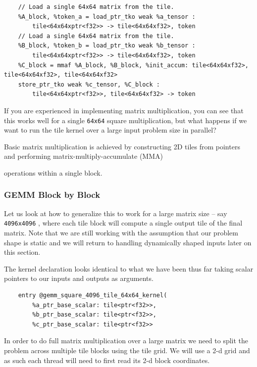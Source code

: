 \documentclass{article}
\begin{document}
\begin{lstlisting}
    // Load a single 64x64 matrix from the tile.
    %A_block, %token_a = load_ptr_tko weak %a_tensor :
        tile<64x64xptr<f32>> -> tile<64x64xf32>, token
    // Load a single 64x64 matrix from the tile.
    %B_block, %token_b = load_ptr_tko weak %b_tensor :
        tile<64x64xptr<f32>> -> tile<64x64xf32>, token
    %C_block = mmaf %A_block, %B_block, %init_accum: tile<64x64xf32>, tile<64x64xf32>, tile<64x64xf32>
    store_ptr_tko weak %c_tensor, %C_block :
        tile<64x64xptr<f32>>, tile<64x64xf32> -> token
\end{lstlisting}

If you are experienced in implementing matrix multiplication, you can see that this works well for a single \texttt{64x64} square multiplication, but what happens if we want to run the tile kernel over a large input problem size in parallel?


Basic matrix multiplication is achieved by constructing 2D tiles from pointers and performing matrix-multiply-accumulate (MMA)

operations within a single block.



\subsubsection{GEMM Block by Block}

Let us look at how to generalize this to work for a large matrix size -- say \texttt{4096x4096} , where each tile block will compute a single output tile of the final matrix. Note that we are still working with the assumption that our problem shape is static and we will return to handling dynamically shaped inputs later on this section.


The kernel declaration looks identical to what we have been thus far taking scalar pointers to our inputs and outputs as arguments.


\begin{lstlisting}
    entry @gemm_square_4096_tile_64x64_kernel(
        %a_ptr_base_scalar: tile<ptr<f32>>,
        %b_ptr_base_scalar: tile<ptr<f32>>,
        %c_ptr_base_scalar: tile<ptr<f32>>
\end{lstlisting}

In order to do full matrix multiplication over a large matrix we need to split the problem across multiple tile blocks using the tile grid. We will use a 2-d grid and as such each thread will need to first read its 2-d block coordinates.
\end{document}
